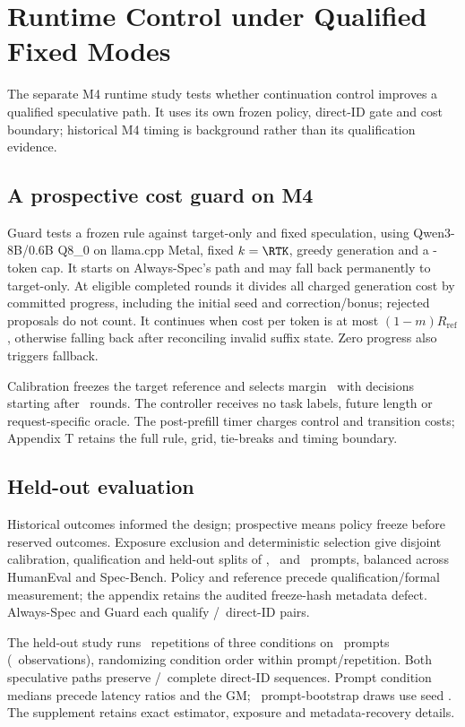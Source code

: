 \section{Runtime Control under Qualified Fixed Modes}
\label{sec:runtime}
The separate M4 runtime study tests whether continuation control improves a qualified speculative path. It uses its own frozen policy, direct-ID gate and cost boundary; historical M4 timing is background rather than its qualification evidence.

\subsection{A prospective cost guard on M4}
Guard tests a frozen rule against target-only and fixed speculation, using Qwen3-8B/0.6B Q8\_0 on llama.cpp Metal, fixed $k=\RTK$, greedy generation and a \RTCap-token cap. It starts on Always-Spec's path and may fall back permanently to target-only. At eligible completed rounds it divides all charged generation cost by committed progress, including the initial seed and correction/bonus; rejected proposals do not count. It continues when cost per token is at most $(1-m)R_{\mathrm{ref}}$, otherwise falling back after reconciling invalid suffix state. Zero progress also triggers fallback.

Calibration freezes the target reference and selects margin \RTMargin\ with decisions starting after \RTRounds\ rounds. The controller receives no task labels, future length or request-specific oracle. The post-prefill timer charges control and transition costs; Appendix T retains the full rule, grid, tie-breaks and timing boundary.

\subsection{Held-out evaluation}
Historical outcomes informed the design; prospective means policy freeze before reserved outcomes. Exposure exclusion and deterministic selection give disjoint calibration, qualification and held-out splits of \RTCalibration, \RTQualification\ and \RTPrompts\ prompts, balanced across HumanEval and Spec-Bench. Policy and reference precede qualification/formal measurement; the appendix retains the audited freeze-hash metadata defect. Always-Spec and Guard each qualify \RTQualPairs/\RTQualPairs\ direct-ID pairs.

The held-out study runs \RTReps\ repetitions of three conditions on \RTPrompts\ prompts (\RTObservations\ observations), randomizing condition order within prompt/repetition. Both speculative paths preserve \RTExact/\RTExact\ complete direct-ID sequences. Prompt condition medians precede latency ratios and the GM; \RTBootstrap\ prompt-bootstrap draws use seed \RTSeed. The supplement retains exact estimator, exposure and metadata-recovery details.

